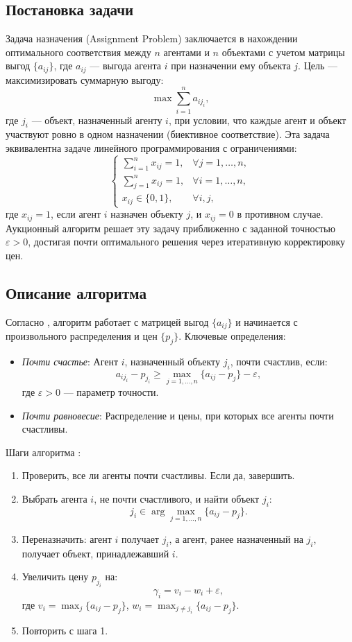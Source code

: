 \subsection{Постановка задачи}
Задача назначения (Assignment Problem) заключается в нахождении оптимального соответствия между $n$ агентами и $n$ объектами с учетом матрицы выгод $\{a_{ij}\}$, где $a_{ij}$ — выгода агента $i$ при назначении ему объекта $j$. Цель — максимизировать суммарную выгоду:
\[
\max \sum_{i=1}^n a_{i j_i},
\]
где $j_i$ — объект, назначенный агенту $i$, при условии, что каждые агент и объект участвуют ровно в одном назначении (биективное соответствие). Эта задача эквивалентна задаче линейного программирования с ограничениями:
\[
\begin{cases}
\sum_{i=1}^n x_{ij} = 1, & \forall j = 1, \ldots, n, \\
\sum_{j=1}^n x_{ij} = 1, & \forall i = 1, \ldots, n, \\
x_{ij} \in \{0, 1\}, & \forall i, j,
\end{cases}
\]
где $x_{ij} = 1$, если агент $i$ назначен объекту $j$, и $x_{ij} = 0$ в противном случае. Аукционный алгоритм решает эту задачу приближенно с заданной точностью $\varepsilon > 0$, достигая почти оптимального решения через итеративную корректировку цен.

\subsection{Описание алгоритма}
Согласно \cite{bertsekas1990}, алгоритм работает с матрицей выгод $\{a_{ij}\}$ и начинается с произвольного распределения и цен $\{p_j\}$. Ключевые определения:
\begin{itemize}
    \item \textit{Почти счастье}: Агент $i$, назначенный объекту $j_i$, почти счастлив, если:
    \[
    a_{i j_i} - p_{j_i} \geq \max_{j=1,\ldots,n} \{a_{ij} - p_j\} - \varepsilon,
    \]
    где $\varepsilon > 0$ — параметр точности.
    \item \textit{Почти равновесие}: Распределение и цены, при которых все агенты почти счастливы.
\end{itemize}

Шаги алгоритма \cite{bertsekas1990}:
\begin{enumerate}
    \item Проверить, все ли агенты почти счастливы. Если да, завершить.
    \item Выбрать агента $i$, не почти счастливого, и найти объект $j_i$:
    \[
    j_i \in \arg \max_{j=1,\ldots,n} \{a_{ij} - p_j\}.
    \]
    \item Переназначить: агент $i$ получает $j_i$, а агент, ранее назначенный на $j_i$, получает объект, принадлежавший $i$.
    \item Увеличить цену $p_{j_i}$ на:
    \[
    \gamma_i = v_i - w_i + \varepsilon,
    \]
    где $v_i = \max_j \{a_{ij} - p_j\}$, $w_i = \max_{j \neq j_i} \{a_{ij} - p_j\}$.
    \item Повторить с шага 1.
\end{enumerate}

